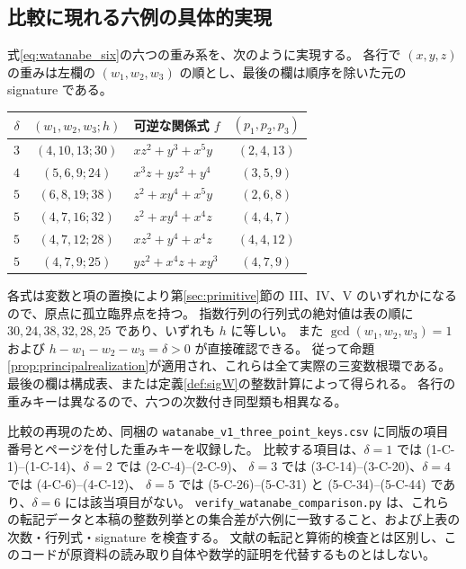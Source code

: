 \documentclass[11pt,a4paper]{ltjsarticle}
\numberwithin{equation}{section}
\theoremstyle{definition}
\begin{document}
\subsection{比較に現れる六例の具体的実現}\label{subsec:watanabe_examples}
式\eqref{eq:watanabe_six}の六つの重み系を、次のように実現する。
各行で $(x,y,z)$ の重みは左欄の $(w_1,w_2,w_3)$ の順とし、最後の欄は順序を除いた元の signature である。
\begin{center}
\begingroup\small
\setlength{\tabcolsep}{5pt}
\renewcommand{\arraystretch}{1.25}
\begin{tabular}{cclc}
\toprule
$\delta$ & $(w_1,w_2,w_3;h)$ & 可逆な関係式 $f$ & $(p_1,p_2,p_3)$\\
\midrule
$3$ & $(4,10,13;30)$ & $xz^2+y^3+x^5y$ & $(2,4,13)$\\
$4$ & $(5,6,9;24)$ & $x^3z+yz^2+y^4$ & $(3,5,9)$\\
$5$ & $(6,8,19;38)$ & $z^2+xy^4+x^5y$ & $(2,6,8)$\\
$5$ & $(4,7,16;32)$ & $z^2+xy^4+x^4z$ & $(4,4,7)$\\
$5$ & $(4,7,12;28)$ & $xz^2+y^4+x^4z$ & $(4,4,12)$\\
$5$ & $(4,7,9;25)$ & $yz^2+x^4z+xy^3$ & $(4,7,9)$\\
\bottomrule
\end{tabular}
\endgroup
\end{center}
各式は変数と項の置換により第\ref{sec:primitive}節の III、IV、V のいずれかになるので、原点に孤立臨界点を持つ。
指数行列の行列式の絶対値は表の順に $30,24,38,32,28,25$ であり、いずれも $h$ に等しい。
また $\gcd(w_1,w_2,w_3)=1$ および $h-w_1-w_2-w_3=\delta>0$ が直接確認できる。
従って命題\ref{prop:principalrealization}が適用され、これらは全て実際の三変数根環である。
最後の欄は構成表、または定義\ref{def:sigW}の整数計算によって得られる。
各行の重みキーは異なるので、六つの次数付き同型類も相異なる。

比較の再現のため、同梱の \texttt{watanabe\_v1\_three\_point\_keys.csv} に同版の項目番号とページを付した重みキーを収録した。
比較する項目は、$\delta=1$ では (1-C-1)--(1-C-14)、$\delta=2$ では (2-C-4)--(2-C-9)、
$\delta=3$ では (3-C-14)--(3-C-20)、$\delta=4$ では (4-C-6)--(4-C-12)、
$\delta=5$ では (5-C-26)--(5-C-31) と (5-C-34)--(5-C-44) であり、$\delta=6$ には該当項目がない。
\texttt{verify\_watanabe\_comparison.py} は、これらの転記データと本稿の整数列挙との集合差が六例に一致すること、および上表の次数・行列式・signature を検査する。
文献の転記と算術的検査とは区別し、このコードが原資料の読み取り自体や数学的証明を代替するものとはしない。
\end{document}
